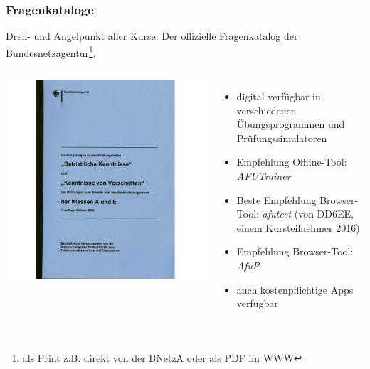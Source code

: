 \begin{frame}
    \frametitle{Fragenkataloge}

    Dreh- und Angelpunkt aller Kurse: Der offizielle Fragenkatalog der
    Bundesnetzagentur\footnote{als Print z.B. direkt von der BNetzA oder als PDF im WWW}.

    \begin{columns}[c]
        \column[c]{3cm}
        \begin{center}
            \includegraphics[height=0.6\textheight]{e00/Fragenkatalog-Klasse-A-und-E-Betriebliche-Kenntnisse-und-Kenntnisse-von-Vorschriften.jpg}
            \tiny \hyperlink{refs}{\cite{darcv}}
        \end{center}
        \column{7cm}
        \begin{itemize}
            \item digital verfügbar in verschiedenen Übungsprogrammen und
            Prüfungssimulatoren
            \item Empfehlung Offline-Tool: \emph{AFUTrainer} \hyperlink{refs}{\cite{afut}}
            \item Beste Empfehlung Browser-Tool: \emph{afutest} \hyperlink{refs}{\cite{afutest}} (von DD6EE, einem Kursteilnehmer 2016)
            \item Empfehlung Browser-Tool: \emph{AfuP} \hyperlink{refs}{\cite{afup}}
            \item auch kostenpflichtige Apps verfügbar
        \end{itemize}
    \end{columns}

\end{frame}

